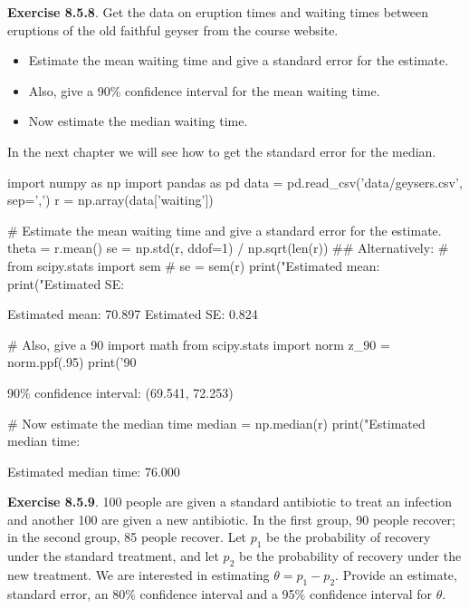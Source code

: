 \textbf{Exercise 8.5.8}. Get the data on eruption times and waiting
times between eruptions of the old faithful geyser from the course
website.
\begin{itemize}[tightlist]
\item
  Estimate the mean waiting time and give a standard error for the
  estimate.
\item
  Also, give a 90\% confidence interval for the mean waiting time.
\item
  Now estimate the median waiting time.
\end{itemize}
In the next chapter we will see how to get the standard error for the
median.

\begin{python}
import numpy as np
import pandas as pd
data = pd.read_csv('data/geysers.csv', sep=',')
r = np.array(data['waiting'])
\end{python}

\begin{python}
# Estimate the mean waiting time and give a standard error for the estimate.
theta = r.mean()
se = np.std(r, ddof=1) / np.sqrt(len(r))
## Alternatively:
# from scipy.stats import sem
# se = sem(r)
print("Estimated mean: %
print("Estimated SE: %
\end{python}
\begin{console}
Estimated mean: 70.897
Estimated SE: 0.824
\end{console}

\begin{python}
# Also, give a 90%
import math
from scipy.stats import norm
z_90 = norm.ppf(.95)
print('90%
\end{python}
\begin{console}
90\% confidence interval: (69.541, 72.253)
\end{console}

\begin{python}
# Now estimate the median time
median = np.median(r)
print("Estimated median time: %
\end{python}
\begin{console}
Estimated median time: 76.000
\end{console}

\textbf{Exercise 8.5.9}. 100 people are given a standard antibiotic to
treat an infection and another 100 are given a new antibiotic. In the
first group, 90 people recover; in the second group, 85 people recover.
Let \(p_{1}\) be the probability of recovery under the standard treatment,
and let \(p_{2}\) be the probability of recovery under the new treatment.
We are interested in estimating \(\theta = p_{1} - p_{2}\). Provide an
estimate, standard error, an 80\% confidence interval and a 95\%
confidence interval for \(\theta\).

